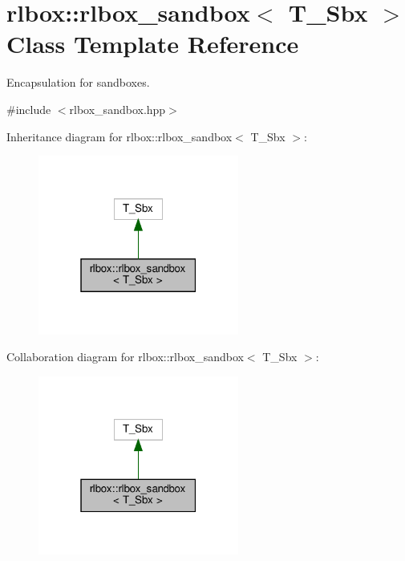 \hypertarget{classrlbox_1_1rlbox__sandbox}{}\section{rlbox\+:\+:rlbox\+\_\+sandbox$<$ T\+\_\+\+Sbx $>$ Class Template Reference}
\label{classrlbox_1_1rlbox__sandbox}


Encapsulation for sandboxes.  




{\ttfamily \#include $<$rlbox\+\_\+sandbox.\+hpp$>$}



Inheritance diagram for rlbox\+:\+:rlbox\+\_\+sandbox$<$ T\+\_\+\+Sbx $>$\+:\nopagebreak
\begin{figure}[H]
\begin{center}
\leavevmode
\includegraphics[width=187pt]{classrlbox_1_1rlbox__sandbox__inherit__graph}
\end{center}
\end{figure}


Collaboration diagram for rlbox\+:\+:rlbox\+\_\+sandbox$<$ T\+\_\+\+Sbx $>$\+:\nopagebreak
\begin{figure}[H]
\begin{center}
\leavevmode
\includegraphics[width=187pt]{classrlbox_1_1rlbox__sandbox__coll__graph}
\end{center}
\end{figure}
